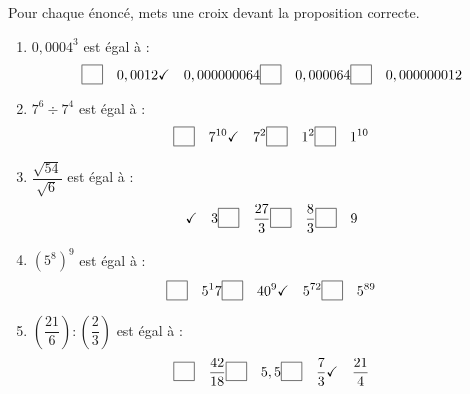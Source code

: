 \medskip

Pour chaque énoncé, mets une croix devant la proposition correcte. 

\begin{enumerate}
\setlength\itemsep{1em}
\fboxsep=1pt
\item $0,0004^3$ est égal à : 
\[\hfill \fbox{\phantom{\checkmark}}\quad 0,0012 \hfill \checkmark \quad 0,000000064 \hfill \fbox{\phantom{\checkmark}}\quad 0,000064 \hfill \fbox{\phantom{\checkmark}}\quad 0,000000012 \hfill\]
\item $7^6\div 7^4$ est égal à : 
\[\hfill \fbox{\phantom{\checkmark}}\quad 7^{10} \hfill \checkmark\quad 7^2 \hfill \fbox{\phantom{\checkmark}}\quad 1^2 \hfill \fbox{\phantom{\checkmark}}\quad 1^{10} \hfill\]
\item $\dfrac{\sqrt{54}}{\sqrt{6}}$ est égal à :
\[\hfill \checkmark\quad 3\hfill \fbox{\phantom{\checkmark}}\quad \dfrac{27}{3} \hfill \fbox{\phantom{\checkmark}}\quad \dfrac{8}{3} \hfill \fbox{\phantom{\checkmark}}\quad 9 \hfill\]
\item $(5^8)^9$ est égal à :
\[\hfill \fbox{\phantom{\checkmark}}\quad 5^17 \hfill \fbox{\phantom{\checkmark}}\quad 40^9 \hfill \checkmark\quad 5^{72} \hfill \fbox{\phantom{\checkmark}}\quad 5^{89} \hfill\]
\item $\left(\dfrac{21}{6}\right):\left(\dfrac{2}{3}\right)$ est égal à :
\[\hfill \fbox{\phantom{\checkmark}}\quad \dfrac{42}{18} \hfill \fbox{\phantom{\checkmark}}\quad 5,5 \hfill \fbox{\phantom{\checkmark}}\quad \dfrac{7}{3} \hfill \checkmark\quad \dfrac{21}{4} \hfill\]
\end{enumerate}